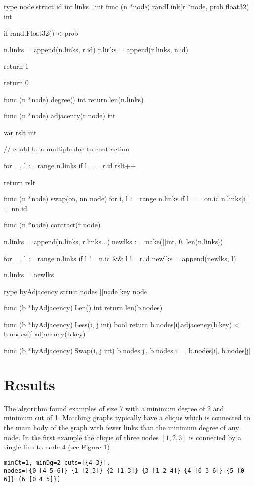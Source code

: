\documentclass[12pt,notitlepage]{article}
\begin{document}
\begin{golang}
type node struct {
	id    int
	links []int
}
func (n *node) randLink(r *node, prob float32) int {
	if rand.Float32() < prob {
		n.links = append(n.links, r.id)
		r.links = append(r.links, n.id)

		return 1
	}

	return 0
}

func (n *node) degree() int {
	return len(n.links)
}

func (n *node) adjacency(r node) int {
	var rslt int

	// could be a multiple due to contraction

	for _, l := range n.links {
		if l == r.id {
			rslt++
		}
	}

	return rslt
}

func (n *node) swap(on, nn node) {
	for i, l := range n.links {
		if l == on.id {
			n.links[i] = nn.id
		}
	}
}

func (n *node) contract(r node) {
	n.links = append(n.links, r.links...)
	newlks := make([]int, 0, len(n.links))

	for _, l := range n.links {
		if l != n.id && l != r.id {
			newlks = append(newlks, l)
		}
	}

	n.links = newlks
}

type byAdjacency struct {
	nodes []node
	key   node
}

func (b *byAdjacency) Len() int {
	return len(b.nodes)
}

func (b *byAdjacency) Less(i, j int) bool {
	return b.nodes[i].adjacency(b.key) < b.nodes[j].adjacency(b.key)
}

func (b *byAdjacency) Swap(i, j int) {
	b.nodes[j], b.nodes[i] = b.nodes[i], b.nodes[j]
}
\end{golang}

\section{Results}
The algorithm found examples of size 7 with a minimum degree of 2 and minimum
cut of 1. Matching graphs typically have a clique which is connected to the main body of
the graph with fewer links than the minimum degree of any node. In the first example the
clique of three nodes $[1,2,3]$ is connected by a single link to node $4$ (see Figure 1).

\begin{Verbatim}
minCt=1, minDg=2 cuts=[{4 3}], 
nodes=[{0 [4 5 6]} {1 [2 3]} {2 [1 3]} {3 [1 2 4]} {4 [0 3 6]} {5 [0 6]} {6 [0 4 5]}]
\end{Verbatim}
\end{document}
